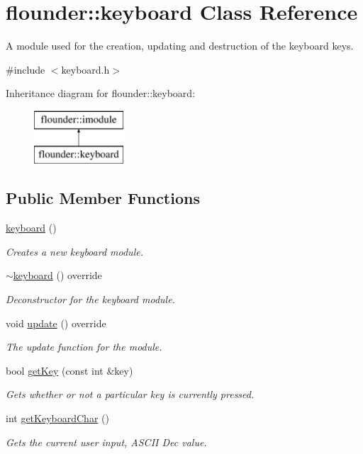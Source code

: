 \hypertarget{classflounder_1_1keyboard}{}\section{flounder\+:\+:keyboard Class Reference}
\label{classflounder_1_1keyboard}


A module used for the creation, updating and destruction of the keyboard keys.  




{\ttfamily \#include $<$keyboard.\+h$>$}

Inheritance diagram for flounder\+:\+:keyboard\+:\begin{figure}[H]
\begin{center}
\leavevmode
\includegraphics[height=2.000000cm]{classflounder_1_1keyboard}
\end{center}
\end{figure}
\subsection*{Public Member Functions}
\begin{DoxyCompactItemize}
\item 
\hyperlink{classflounder_1_1keyboard_a2545f195eb7f57530cdc9056f641702c}{keyboard} ()
\begin{DoxyCompactList}\small\item\em Creates a new keyboard module. \end{DoxyCompactList}\item 
\hyperlink{classflounder_1_1keyboard_ac78be35918c4741e37bc0d35976f5a4a}{$\sim$keyboard} () override
\begin{DoxyCompactList}\small\item\em Deconstructor for the keyboard module. \end{DoxyCompactList}\item 
void \hyperlink{classflounder_1_1keyboard_a9fe79eabe905466fd90413d2c3b68841}{update} () override
\begin{DoxyCompactList}\small\item\em The update function for the module. \end{DoxyCompactList}\item 
bool \hyperlink{classflounder_1_1keyboard_a0138ab3a7770eae57039618cb8d54992}{get\+Key} (const int \&key)
\begin{DoxyCompactList}\small\item\em Gets whether or not a particular key is currently pressed. \end{DoxyCompactList}\item 
int \hyperlink{classflounder_1_1keyboard_ad941be3ae52b1c60437695d8faf1b6d7}{get\+Keyboard\+Char} ()
\begin{DoxyCompactList}\small\item\em Gets the current user input, A\+S\+C\+II Dec value. \end{DoxyCompactList}\end{DoxyCompactItemize}
